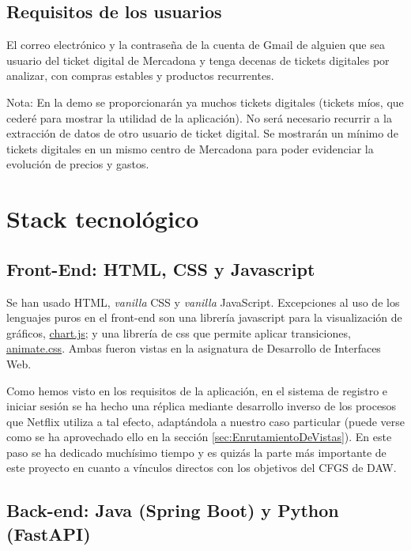 \documentclass[a4paper,12pt]{report}
\begin{document}
			\subsection{Requisitos de los usuarios}
			
			El correo electrónico y la contraseña de la cuenta de Gmail de alguien que sea usuario del ticket digital de Mercadona y tenga decenas de tickets digitales por analizar, con compras estables y productos recurrentes.
			
			Nota: En la demo se proporcionarán ya muchos tickets digitales (tickets míos, que cederé para mostrar la utilidad de la aplicación). No será necesario recurrir a la extracción de datos de otro usuario de ticket digital. Se mostrarán un mínimo de tickets digitales en un mismo centro de Mercadona para poder evidenciar la evolución de precios y gastos.
			
		
		\section{Stack tecnológico}
	
		
			 \subsection{Front-End: HTML, CSS y Javascript}
			 
			Se han usado HTML, \textit{vanilla} CSS y \textit{vanilla} JavaScript. Excepciones al uso de los lenguajes puros en el front-end son una librería javascript para la visualización de gráficos, \href{https://www.chartjs.org/}{chart.js}\cite{chartjs}; y una librería de css que permite aplicar transiciones, \href{https://animate.style/}{animate.css}\cite{animatecss}. Ambas fueron vistas en la asignatura de Desarrollo de Interfaces Web.
			
			Como hemos visto en los requisitos de la aplicación, en el sistema de registro e iniciar sesión se ha hecho una réplica mediante desarrollo inverso de los procesos que Netflix utiliza a tal efecto, adaptándola a nuestro caso particular (puede verse como se ha aprovechado ello en la sección \ref{sec:EnrutamientoDeVistas}). En este paso se ha dedicado muchísimo tiempo y es quizás la parte más importante de este proyecto en cuanto a vínculos directos con los objetivos del CFGS de DAW.
			
	
		 
		\subsection{Back-end: Java (Spring Boot) y Python (FastAPI)}
		
\end{document}
